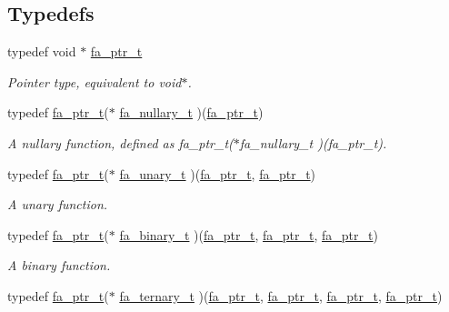 \subsection*{Typedefs}
\begin{DoxyCompactItemize}
\item 
typedef void $\ast$ \hyperlink{group___fa_ga915ddeae99ad7568b273d2b876425197}{fa\-\_\-ptr\-\_\-t}
\begin{DoxyCompactList}\small\item\em Pointer type, equivalent to {\ttfamily void$\ast$}. \end{DoxyCompactList}\item 
typedef \hyperlink{group___fa_ga915ddeae99ad7568b273d2b876425197}{fa\-\_\-ptr\-\_\-t}($\ast$ \hyperlink{group___fa_ga43b940a9294fd58a54087ef0b416e479}{fa\-\_\-nullary\-\_\-t} )(\hyperlink{group___fa_ga915ddeae99ad7568b273d2b876425197}{fa\-\_\-ptr\-\_\-t})
\begin{DoxyCompactList}\small\item\em A nullary function, defined as {\ttfamily fa\-\_\-ptr\-\_\-t($\ast$fa\-\_\-nullary\-\_\-t )(fa\-\_\-ptr\-\_\-t)}. \end{DoxyCompactList}\item 
typedef \hyperlink{group___fa_ga915ddeae99ad7568b273d2b876425197}{fa\-\_\-ptr\-\_\-t}($\ast$ \hyperlink{group___fa_gaaafae8ab9ebae9019133108e56d2d4d1}{fa\-\_\-unary\-\_\-t} )(\hyperlink{group___fa_ga915ddeae99ad7568b273d2b876425197}{fa\-\_\-ptr\-\_\-t}, \hyperlink{group___fa_ga915ddeae99ad7568b273d2b876425197}{fa\-\_\-ptr\-\_\-t})
\begin{DoxyCompactList}\small\item\em A unary function. \end{DoxyCompactList}\item 
typedef \hyperlink{group___fa_ga915ddeae99ad7568b273d2b876425197}{fa\-\_\-ptr\-\_\-t}($\ast$ \hyperlink{group___fa_gab70ba406935a18c1d645d12e7abf2e63}{fa\-\_\-binary\-\_\-t} )(\hyperlink{group___fa_ga915ddeae99ad7568b273d2b876425197}{fa\-\_\-ptr\-\_\-t}, \hyperlink{group___fa_ga915ddeae99ad7568b273d2b876425197}{fa\-\_\-ptr\-\_\-t}, \hyperlink{group___fa_ga915ddeae99ad7568b273d2b876425197}{fa\-\_\-ptr\-\_\-t})
\begin{DoxyCompactList}\small\item\em A binary function. \end{DoxyCompactList}\item 
typedef \hyperlink{group___fa_ga915ddeae99ad7568b273d2b876425197}{fa\-\_\-ptr\-\_\-t}($\ast$ \hyperlink{group___fa_gadbab7e8e405b3d2436de1e1126cc4817}{fa\-\_\-ternary\-\_\-t} )(\hyperlink{group___fa_ga915ddeae99ad7568b273d2b876425197}{fa\-\_\-ptr\-\_\-t}, \hyperlink{group___fa_ga915ddeae99ad7568b273d2b876425197}{fa\-\_\-ptr\-\_\-t}, \hyperlink{group___fa_ga915ddeae99ad7568b273d2b876425197}{fa\-\_\-ptr\-\_\-t}, \hyperlink{group___fa_ga915ddeae99ad7568b273d2b876425197}{fa\-\_\-ptr\-\_\-t})

\end{DoxyCompactItemize}
